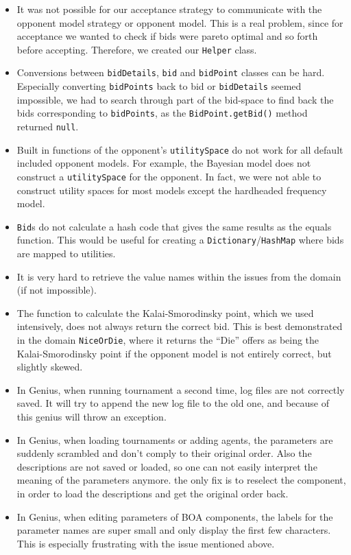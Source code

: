 \begin{itemize}
\item It was not possible for our acceptance strategy to communicate with the 
opponent model strategy or opponent model. This is a real problem, 
since for acceptance we wanted to check if bids were pareto optimal and so forth
before accepting. Therefore, we created our \texttt{Helper} class.
\item Conversions between \verb-bidDetails-, \verb-bid- and \verb-bidPoint- classes can be hard. Especially 
converting \verb-bidPoints- back to bid or \verb-bidDetails- seemed impossible, we had to search through
part of the bid-space to find back the bids corresponding to \verb-bidPoints-, as the \texttt{BidPoint.getBid()} method returned \texttt{null}.
\item Built in functions of the opponent's \verb-utilitySpace- do not work for all default included 
opponent models. For example, the Bayesian model does not construct a \verb-utilitySpace- for the opponent. 
In fact, we were not able to construct utility spaces for most models except the hardheaded frequency model. 
\item \verb-Bid-s do not calculate a hash code that gives the same results as the equals function. This would 
be useful for creating a \verb-Dictionary-/\verb-HashMap- where bids are mapped to utilities.
\item It is very hard to retrieve the value names within the issues from the domain (if not impossible).
\item The function to calculate the Kalai-Smorodinsky point, which we used intensively,
does not always return the correct bid. This is best demonstrated in the domain 
\verb-NiceOrDie-, where it returns the ``Die'' offers as being the Kalai-Smorodinsky point if the opponent model
is not entirely correct, but slightly skewed.
\item In Genius, when running tournament a second time, log files are not correctly saved.
It will try to append the new log file to the old one, and because of this genius will throw
an exception. 
\item In Genius, when loading tournaments or adding agents, the parameters are suddenly scrambled and don't comply to their original order. Also the descriptions are not saved or loaded, so one can not easily interpret the meaning of the parameters anymore. the only fix is to reselect the component, in order to load the descriptions and get the original order back.
\item In Genius, when editing parameters of BOA components, the labels for the parameter names are super small and only display the first few characters. This is especially frustrating with the issue mentioned above.

\end{itemize}
